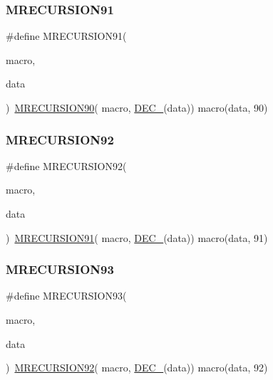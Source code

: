 \subsubsection{\texorpdfstring{MRECURSION91}{MRECURSION91}}
{\footnotesize\ttfamily \#define M\+R\+E\+C\+U\+R\+S\+I\+O\+N91(\begin{DoxyParamCaption}\item[{}]{macro,  }\item[{}]{data }\end{DoxyParamCaption})~\mbox{\hyperlink{group__group__sam0__utils__mrecursion_gaaf8d19004bc883b73606eec23ce0e29a}{M\+R\+E\+C\+U\+R\+S\+I\+O\+N90}}(  macro, \mbox{\hyperlink{group__group__sam0__utils__mrecursion_ga1d23d683797679dca8c3512a54a5dcae}{D\+E\+C\+\_\+}}(data))   macro(data, 90)}

\mbox{\label{group__group__sam0__utils__mrecursion_gab27a1381cfcad4d4398dbd87166b9189}} 
\subsubsection{\texorpdfstring{MRECURSION92}{MRECURSION92}}
{\footnotesize\ttfamily \#define M\+R\+E\+C\+U\+R\+S\+I\+O\+N92(\begin{DoxyParamCaption}\item[{}]{macro,  }\item[{}]{data }\end{DoxyParamCaption})~\mbox{\hyperlink{group__group__sam0__utils__mrecursion_ga07bd82d35c4d64112e70c61028ce1580}{M\+R\+E\+C\+U\+R\+S\+I\+O\+N91}}(  macro, \mbox{\hyperlink{group__group__sam0__utils__mrecursion_ga1d23d683797679dca8c3512a54a5dcae}{D\+E\+C\+\_\+}}(data))   macro(data, 91)}

\mbox{\label{group__group__sam0__utils__mrecursion_gaf2a7b1d3f531f42ba19275b3bfbc5096}} 
\subsubsection{\texorpdfstring{MRECURSION93}{MRECURSION93}}
{\footnotesize\ttfamily \#define M\+R\+E\+C\+U\+R\+S\+I\+O\+N93(\begin{DoxyParamCaption}\item[{}]{macro,  }\item[{}]{data }\end{DoxyParamCaption})~\mbox{\hyperlink{group__group__sam0__utils__mrecursion_gab27a1381cfcad4d4398dbd87166b9189}{M\+R\+E\+C\+U\+R\+S\+I\+O\+N92}}(  macro, \mbox{\hyperlink{group__group__sam0__utils__mrecursion_ga1d23d683797679dca8c3512a54a5dcae}{D\+E\+C\+\_\+}}(data))   macro(data, 92)}

